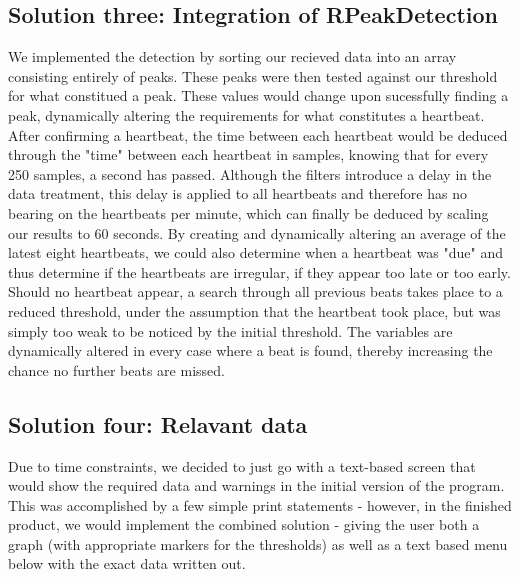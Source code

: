 \documentclass[12pt,a4paper]{article}
\begin{document}
\subsection{Solution three: Integration of RPeakDetection}
We implemented the detection by sorting our recieved data into an array consisting entirely of peaks. These peaks were then tested against our threshold for what constitued a peak. These values would change upon sucessfully finding a peak, dynamically altering the requirements for what constitutes a heartbeat. After confirming a heartbeat, the time between each heartbeat would be deduced through the "time" between each heartbeat in samples, knowing that for every 250 samples, a second has passed. Although the filters introduce a delay in the data treatment, this delay is applied to all heartbeats and therefore has no bearing on the heartbeats per minute, which can finally be deduced by scaling our results to 60 seconds. By creating and dynamically altering an average of the latest eight heartbeats, we could also determine when a heartbeat was "due" and thus determine if the heartbeats are irregular, if they appear too late or too early. Should no heartbeat appear, a search through all previous beats takes place to a reduced threshold, under the assumption that the heartbeat took place, but was simply too weak to be noticed by the initial threshold. The variables are dynamically altered in every case where a beat is found, thereby increasing the chance no further beats are missed.
\subsection{Solution four: Relavant data}
Due to time constraints, we decided to just go with a text-based screen that would show the required data and warnings in the initial version of the program. This was accomplished by a few simple print statements - however, in the finished product, we would implement the combined solution - giving the user both a graph (with appropriate markers for the thresholds) as well as a text based menu below with the exact data written out.
\end{document}
